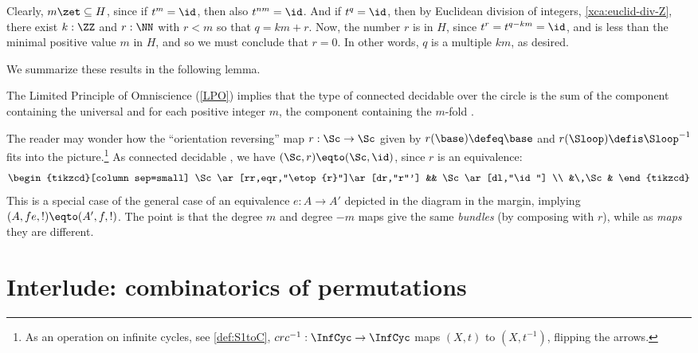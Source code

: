 Clearly, $m\zet \subseteq H$, since if $t^m=\id$, then also $t^{nm}=\id$.
And if $t^q=\id$, then by Euclidean division of integers, \cref{xca:euclid-div-Z},
there exist $k:\ZZ$ and $r:\NN$ with $r<m$ so that $q=km+r$.
Now, the number $r$ is in $H$, since $t^r=t^{q-km}=\id$,
and is less than the minimal positive value $m$ in $H$,
and so we must conclude that $r=0$.
In other words, $q$ is a multiple $km$, as desired.

We summarize these results in the following lemma.

\begin{lemma}
  \label{lem:componentsofcoversofS1}
  The Limited Principle of Omniscience (\cref{LPO})
  implies that the type of connected decidable \coverings over the circle is the sum
of the component containing the universal \covering and for each positive integer $m$,
the component containing the $m$-fold \covering.
\end{lemma}

\begin{remark}
  \label{rem:flipthecircle}
The reader may wonder how the ``orientation reversing'' map $r:\Sc\to \Sc$ given
by $r(\base)\defeq\base$ and $r(\Sloop)\defis\Sloop^{-1}$ fits into the picture.\footnote{%
  As an operation on infinite cycles, see \cref{def:S1toC},
  $c r c^{-1} : \InfCyc\to\InfCyc$ maps $(X,t)$ to $(X,t^{-1})$,
  flipping the arrows.}
As connected decidable \coverings, we have
$(\Sc,r) \eqto (\Sc,\id)$, since $r$ is an equivalence:
\[
  \begin{tikzcd}[column sep=small]
    \Sc\ar[rr,eqr,"\etop{r}"]\ar[dr,"r"'] && \Sc\ar[dl,"\id"] \\
    &\,\Sc&
  \end{tikzcd}
\]
This is a special case of the general case of an equivalence
$e: A\to A'$ depicted in the diagram in the margin,
implying $(A,fe,!)\eqto(A',f,!)$.
The point is that the degree $m$ and degree $-m$ maps give the same \emph{bundles} (by composing with $r$), while as \emph{maps} they are different.
\end{remark}

\section{Interlude: combinatorics of permutations}\label{sec:permutations}

